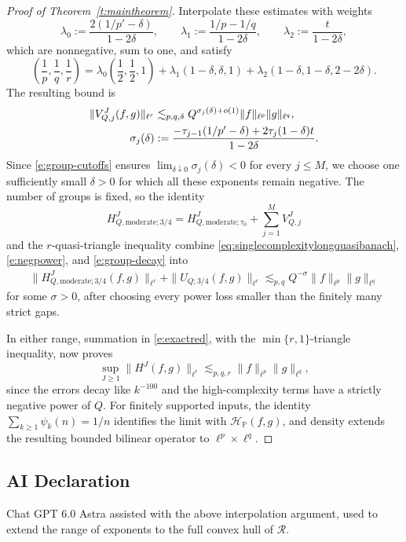 \documentclass[12pt,leqno]{amsart}
\numberwithin{equation}{section}
\theoremstyle{definition}
\theoremstyle{plain}
\begin{document}
\begin{proof}[Proof of Theorem~\ref{t:maintheorem}]
		Interpolate these estimates with weights
		\[
		\lambda_0:=\frac{2(1/p'-\delta)}{1-2\delta},\qquad
		\lambda_1:=\frac{1/p-1/q}{1-2\delta},\qquad
		\lambda_2:=\frac{t}{1-2\delta},
		\]
		which are nonnegative, sum to one, and satisfy
		\[
		\left(\frac1p,\frac1q,\frac1r\right)
		=\lambda_0\left(\frac12,\frac12,1\right)
		+\lambda_1(1-\delta,\delta,1)
		+\lambda_2(1-\delta,1-\delta,2-2\delta).
		\]
		The resulting bound is
		\begin{align}\label{e:group-decay}
			\|V_{Q,j}^J(f,g)\|_{\ell^r}
			&\lesssim_{p,q,\delta}Q^{\sigma_j(\delta)+o(1)}
			\|f\|_{\ell^p}\|g\|_{\ell^q},\notag\\
			\sigma_j(\delta)
			&:=\frac{-\tau_{j-1}(1/p'-\delta)
				+2\tau_j(1-\delta)t}{1-2\delta}.
		\end{align}
		Since \eqref{e:group-cutoffs} ensures $\lim_{\delta \downarrow0} \sigma_j(\delta)<0$ for every $j \leq M$,
		we choose one sufficiently small $\delta>0$ for which all these
		exponents remain negative.
		The number of groups is fixed, so the identity
		\[
		H^J_{Q,\mathrm{moderate};3/4}
		=H^J_{Q,\mathrm{moderate};\tau_0}+\sum_{j=1}^M V_{Q,j}^J
		\]
		and the $r$-quasi-triangle inequality combine
		\eqref{eq:singlecomplexitylongquasibanach}, \eqref{e:negpower}, and
		\eqref{e:group-decay} into
		\begin{align}\label{e:complexity-decay}
			\|H^J_{Q,\mathrm{moderate};3/4}(f,g)\|_{\ell^r}
			+\|U_{Q;3/4}(f,g)\|_{\ell^r}
			\lesssim_{p,q}Q^{-\sigma}\|f\|_{\ell^p}\|g\|_{\ell^q}
		\end{align}
		for some $\sigma>0$, after choosing every power loss smaller than
		the finitely many strict gaps.
		
		In either range, summation in \eqref{e:exactred}, with the
		$\min\{r,1\}$-triangle inequality, now proves
		\[
		\sup_{J\geq1}\|H^J(f,g)\|_{\ell^r}
		\lesssim_{p,q,r}\|f\|_{\ell^p}\|g\|_{\ell^q},
		\]
		since the errors decay like $k^{-100}$ and the high-complexity
		terms have a strictly negative power of $Q$.
		For finitely supported inputs, the identity
		$\sum_{k\geq1}\psi_k(n)=1/n$ identifies the limit with
		$\mathcal H_{\mathbb P}(f,g)$, and density extends the resulting
		bounded bilinear operator to $\ell^p\times\ell^q$.
	\end{proof}
	
	\subsection{AI Declaration}
	Chat GPT 6.0 Astra assisted with the above interpolation argument, used to extend the range of exponents to the full convex hull of $\mathcal{R}$.
	
	
	
	
	
	
	
\end{document}
